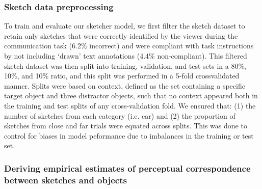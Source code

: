 \documentclass[9pt,twocolumn,twoside]{pnas-new}
\begin{document}
{%

\subsubsection*{Sketch data preprocessing} 
To train and evaluate our sketcher model, we first filter the sketch dataset to retain only sketches that were correctly identified by the viewer during the communication task (6.2\% incorrect) and were compliant with task instructions by not including `drawn' text annotations (4.4\% non-compliant). 
This filtered sketch dataset was then split into training, validation, and test sets in a 80\%, 10\%, and 10\% ratio, and this split was performed in a 5-fold crossvalidated manner.
Splits were based on context, defined as the set containing a specific target object and three distractor objects, such that no context appeared both in the training and test splits of any cross-validation fold. 
We ensured that: (1) the number of sketches from each category (i.e. car) and (2) the proportion of sketches from close and far trials were equated across splits. 
This was done to control for biases in model peformance due to imbalances in the training or test set.

\subsubsection*{Deriving empirical estimates of perceptual correspondence between sketches and objects}

}
\end{document}
